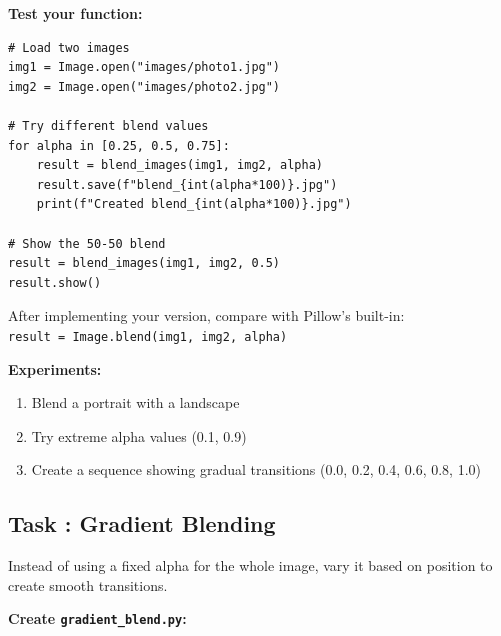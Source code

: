 \documentclass[11pt]{article}
\newcounter{taskcounter}
\newcommand{\task}[1]{%
    \stepcounter{taskcounter}%
    \subsection*{Task \thetaskcounter: #1}%
}
\begin{document}
\textbf{Test your function:}

\begin{lstlisting}
# Load two images
img1 = Image.open("images/photo1.jpg")
img2 = Image.open("images/photo2.jpg")

# Try different blend values
for alpha in [0.25, 0.5, 0.75]:
    result = blend_images(img1, img2, alpha)
    result.save(f"blend_{int(alpha*100)}.jpg")
    print(f"Created blend_{int(alpha*100)}.jpg")

# Show the 50-50 blend
result = blend_images(img1, img2, 0.5)
result.show()
\end{lstlisting}

\begin{hint}
After implementing your version, compare with Pillow's built-in: \\
\texttt{result = Image.blend(img1, img2, alpha)}
\end{hint}

\textbf{Experiments:}
\begin{enumerate}
    \item Blend a portrait with a landscape
    \item Try extreme alpha values (0.1, 0.9)
    \item Create a sequence showing gradual transitions (0.0, 0.2, 0.4, 0.6, 0.8, 1.0)
\end{enumerate}

\task{Gradient Blending}

Instead of using a fixed alpha for the whole image, vary it based on position to create smooth transitions.

\textbf{Create \texttt{gradient\_blend.py}:}
\end{document}
